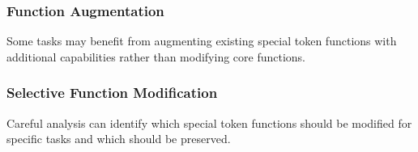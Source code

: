 \subsubsection{Function Augmentation}

Some tasks may benefit from augmenting existing special token functions with additional capabilities rather than modifying core functions.

\subsubsection{Selective Function Modification}

Careful analysis can identify which special token functions should be modified for specific tasks and which should be preserved.